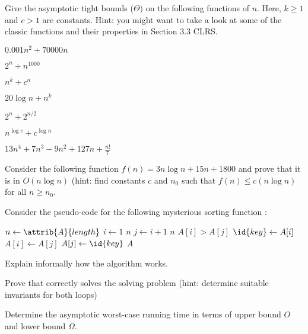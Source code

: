 \documentclass{article}
\begin{document}
\thispagestyle{fancy}

\begin{Exercise}

    \noindent
    Give the asymptotic tight bounds ($\Theta)$ on the following functions of
    $n$. Here, $k \geq 1$ and $c > 1$ are constants. Hint: you might want to
    take a look at some of the classic functions and their properties in Section
    3.3 CLRS.

    \Question
    $0.001n^2 + 70000n$
    
    \Question
    $2^n + n^{1000}$

    \Question
    $n^k + c^n$

    \Question
    $20 \log n + n^k$

    \Question
    $2^n + 2^{n/2}$

    \Question
    $n^{\log c} + c^{\log n}$

    \Question
    $13n^4 + 7n^3 - 9n^2 + 127n + \frac{n!}{7}$
\end{Exercise}

\begin{Exercise}
    
    \noindent
    Consider the following function $f(n) = 3n \log n + 15n + 1800$ and prove
    that it is in $O(n \log n)$ (hint: find constants $c$ and $n_0$ such that
    $f(n) \leq c(n \log n)$ for all $n \geq n_0$.

\end{Exercise}

\begin{Exercise}

    \noindent
    Consider the pseudo-code for the following mysterious  sorting function
    :
    
    \begin{codebox}
        \li $n \gets \attrib{A}{length}$
        \li \For $i \gets 1$ \To $n$ \Do
            \li \For $j \gets i+1$ \To $n$ \Do
                \li \If $A[i] > A[j]$ \Then
                    \li $\id{key} \gets A[i]$
                    \li $A[i] \gets A[j]$
                    \li $A[j] \gets \id{key}$
                \End
            \End
        \End
        \li \Return $A$
    \end{codebox}

    \Question
    Explain informally how the algorithm works.

    \Question
    Prove that  correctly solves the solving problem (hint: determine
    suitable invariants for both loops)

    \Question
    Determine the asymptotic worst-case running time in terms of upper bound $O$
    and lower bound $\Omega$.

\end{Exercise}
\end{document}
